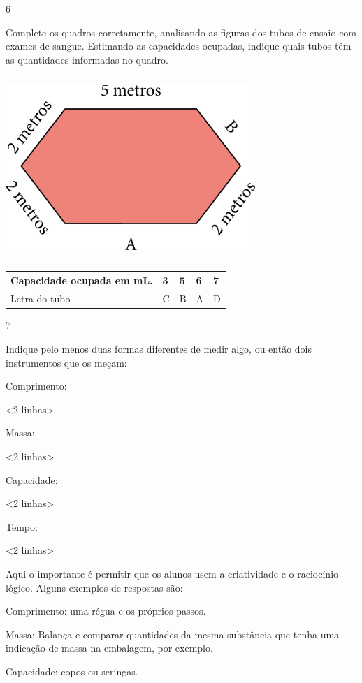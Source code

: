 {\num{6}

Complete os quadros corretamente, analisando as figuras dos tubos de
ensaio com exames de sangue. Estimando as capacidades ocupadas, indique
quais tubos têm as quantidades informadas no quadro.


\includegraphics[width=3.71875in,height=2.70833in]{media/image47.png}

\begin{longtable}[]{@{}lllll@{}}
\toprule
Capacidade ocupada em mL. & 3 & 5 & 6 & 7\tabularnewline
\midrule
\endhead
Letra do tubo & C & B & A & D\tabularnewline
\bottomrule
\end{longtable}

\num{7}

Indique pelo menos duas formas diferentes de medir algo, ou então dois
instrumentos que os meçam:

Comprimento:

\textless{}2 linhas\textgreater{}

Massa:

\textless{}2 linhas\textgreater{}

Capacidade:

\textless{}2 linhas\textgreater{}

Tempo:

\textless{}2 linhas\textgreater{}

Aqui o importante é permitir que os alunos usem a
criatividade e o raciocínio lógico. Alguns exemplos de respostas são:

Comprimento: uma régua e os próprios passos.

Massa: Balança e comparar quantidades da mesma substância que tenha uma
indicação de massa na embalagem, por exemplo.

Capacidade: copos ou seringas.

}
